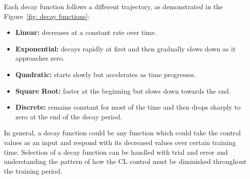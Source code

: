 Each decay function follows a different trajectory, as demonstrated in the Figure~\ref{fig: decay functions}:

\begin{itemize}
	\item \textbf{Linear:} decreases at a constant rate over time.
	\item \textbf{Exponential:} decays rapidly at first and then gradually slows down as it approaches zero.
	\item \textbf{Quadratic:} starts slowly but accelerates as time progresses.
	\item \textbf{Square Root:} faster at the beginning but slows down towards the end.
	\item \textbf{Discrete:} remains constant for most of the time and then drops sharply to zero at the end of the decay period.
\end{itemize}

In general, a decay function could be any function which could take the control values as an input and respond with its decreased values over certain training time. Selection of a decay function can be handled with trial and error and understanding the pattern of how the CL control must be diminished throughout the training period.